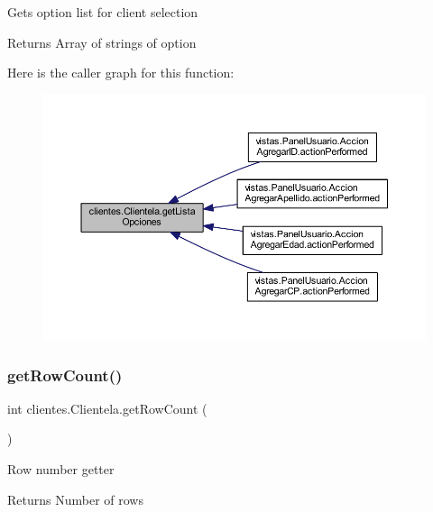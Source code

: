 Gets option list for client selection \begin{DoxyReturn}{Returns}
Array of strings of option 
\end{DoxyReturn}
Here is the caller graph for this function\+:\nopagebreak
\begin{figure}[H]
\begin{center}
\leavevmode
\includegraphics[width=350pt]{classclientes_1_1_clientela_a036492cd5e2bba079ef0874b9693d9e1_icgraph}
\end{center}
\end{figure}
\mbox{\label{classclientes_1_1_clientela_a2637748da710e9aa18044fd614d3e1cc}} 
\subsubsection{\texorpdfstring{get\+Row\+Count()}{getRowCount()}}
{\footnotesize\ttfamily int clientes.\+Clientela.\+get\+Row\+Count (\begin{DoxyParamCaption}{ }\end{DoxyParamCaption})}

Row number getter \begin{DoxyReturn}{Returns}
Number of rows 
\end{DoxyReturn}
\mbox{\label{classclientes_1_1_clientela_a58c7e701ceb7a1eb87d4aa996fc1e546}} 
